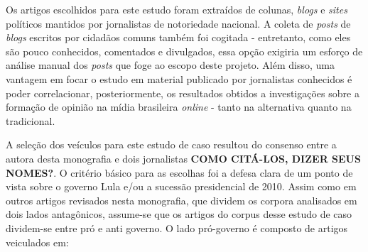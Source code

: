 Os artigos escolhidos para este estudo foram extraídos de colunas, \emph{blogs} e \emph{sites} políticos mantidos por jornalistas de notoriedade nacional. A coleta de \emph{posts} de \emph{blogs} escritos por cidadãos comuns também foi cogitada - entretanto, como eles são pouco conhecidos, comentados e divulgados, essa opção exigiria um esforço de análise manual dos \emph{posts} que foge ao escopo deste projeto. Além disso, uma vantagem em focar o estudo em material publicado por jornalistas conhecidos é poder correlacionar, posteriormente, os resultados obtidos a investigações sobre a formação de opinião na mídia brasileira \emph{online} - tanto na alternativa quanto na tradicional. 

A seleção dos veículos para este estudo de caso resultou do consenso entre a autora desta monografia e dois jornalistas \textbf{COMO CITÁ-LOS, DIZER SEUS NOMES?}. O critério básico para as escolhas foi a defesa clara de um ponto de vista sobre o governo Lula e/ou a sucessão presidencial de 2010. Assim como em outros artigos revisados nesta monografia, que dividem os corpora analisados em dois lados antagônicos, assume-se que os artigos do corpus desse estudo de caso dividem-se entre pró e anti governo. O lado pró-governo é composto de artigos veiculados em:





